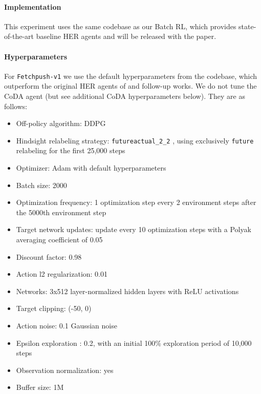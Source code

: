 \documentclass[coda.tex]{subfiles}
\begin{document}
\paragraph{Implementation} This experiment uses the same codebase as our Batch RL, which provides state-of-the-art baseline HER agents and will be released with the paper.

\paragraph{Hyperparameters}
For \texttt{Fetchpush-v1} we use the default hyperparameters from the codebase, which outperform the original HER agents of \cite{andrychowicz2017hindsight,plappert2018multi} and follow-up works. We do not tune the CoDA agent (but see additional CoDA hyperparameters below). They are as follows:
\begin{itemize}
\item Off-policy algorithm: DDPG \cite{lillicrap2015continuous}
\item Hindsight relabeling strategy:  \texttt{futureactual\_2\_2} \cite{pitisprotoge}, using exclusively \texttt{future} \cite{andrychowicz2017hindsight} relabeling for the first 25,000 steps
\item Optimizer: Adam \cite{kingma2014adam} with default hyperparameters
\item Batch size: 2000
\item Optimization frequency: 1 optimization step every 2 environment steps after the 5000th environment step
\item Target network updates: update every 10 optimization steps with a Polyak averaging coefficient of 0.05
\item Discount factor: 0.98
\item Action l2 regularization: 0.01
\item Networks: 3x512 layer-normalized \cite{ba2016layer} hidden layers with ReLU activations
\item Target clipping: (-50, 0)
\item Action noise: 0.1 Gaussian noise
\item Epsilon exploration \cite{plappert2018multi}: 0.2, with an initial 100\% exploration period of 10,000 steps
\item Observation normalization: yes
\item Buffer size: 1M
\end{itemize}
\end{document}
